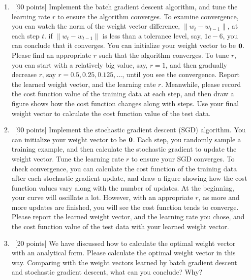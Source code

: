 \documentclass[12pt, fullpage,letterpaper]{article}
\begin{document}
\begin{enumerate}
\begin{enumerate}
\item~[90 points] Implement the batch gradient descent algorithm, and tune the learning rate $r$ to ensure the algorithm converges.  To examine convergence, you can watch the norm of the weight vector difference,  $\|w_{t} - w_{t-1}\|$,  at each step $t$.  if $\|w_{t} - w_{t-1}\|$ is  less than a tolerance level, say, $1e-6$, you can conclude that it converges. You can initialize your weight vector to be ${\bf 0}$.  Please find an appropriate $r$ such that the algorithm converges. To tune $r$, you can start with a relatively big value, say, $r=1$, and then gradually decrease $r$, say $r=0.5, 0.25, 0.125, \ldots$, until you see the convergence. 
Report the learned weight vector, and the learning rate $r$. Meanwhile, please record the cost function  value of the training data at each step, and then draw a figure shows how the cost function changes along with steps. Use your final weight vector to calculate  the cost function value of the test data. 
\item~[90 points] Implement the stochastic gradient descent (SGD) algorithm. You can initialize your weight vector to be ${\bf 0}$. Each step, you randomly sample a training example, and then calculate the stochastic gradient to update the weight vector.  Tune the learning rate $r$ to ensure your SGD converges. To check convergence, you can calculate the cost function of the training data after each stochastic gradient update, and draw a figure showing how the cost function values vary along with the number of updates. At the beginning, your curve will oscillate a lot. However, with an appropriate $r$, as more and more updates are finished, you will see the cost function tends to converge. Please report the learned weight vector, and the learning rate you chose, and the cost function value of the test data with your learned weight vector.   
\item~[20 points] We have discussed how to  calculate the optimal weight vector with an analytical form. Please calculate the optimal weight vector in this way. Comparing with the  weight vectors learned by batch gradient descent and stochastic gradient descent, what can you conclude? Why?
\end{enumerate}




\end{enumerate}
\end{document}
